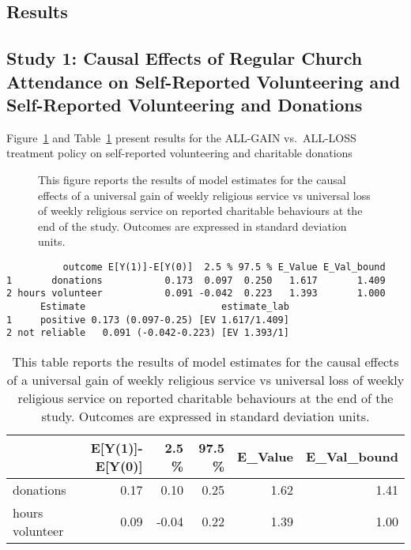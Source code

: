 \documentclass[
  single column]{article}
\begin{document}
\newpage{}

\subsection{Results}\label{results}

\subsection{Study 1: Causal Effects of Regular Church Attendance on
Self-Reported Volunteering and Self-Reported Volunteering and
Donations}\label{study-1-causal-effects-of-regular-church-attendance-on-self-reported-volunteering-and-self-reported-volunteering-and-donations}

Figure~\ref{fig-1_1} and Table~\ref{tbl-1_1} present results for the
ALL-GAIN vs.~ALL-LOSS treatment policy on self-reported volunteering and
charitable donations

\begin{figure}


\caption{\label{fig-1_1}This figure reports the results of model
estimates for the causal effects of a universal gain of weekly religious
service vs universal loss of weekly religious service on reported
charitable behaviours at the end of the study. Outcomes are expressed in
standard deviation units.}

\end{figure}%

\begin{verbatim}
          outcome E[Y(1)]-E[Y(0)]  2.5 % 97.5 % E_Value E_Val_bound
1       donations           0.173  0.097  0.250   1.617       1.409
2 hours volunteer           0.091 -0.042  0.223   1.393       1.000
      Estimate                        estimate_lab
1     positive 0.173 (0.097-0.25) [EV 1.617/1.409]
2 not reliable   0.091 (-0.042-0.223) [EV 1.393/1]
\end{verbatim}

\begin{longtable}[]{@{}lrrrrr@{}}

\caption{\label{tbl-1_1}This table reports the results of model
estimates for the causal effects of a universal gain of weekly religious
service vs universal loss of weekly religious service on reported
charitable behaviours at the end of the study. Outcomes are expressed in
standard deviation units.}

\tabularnewline

\toprule\noalign{}
& E{[}Y(1){]}-E{[}Y(0){]} & 2.5 \% & 97.5 \% & E\_Value &
E\_Val\_bound \\
\midrule\noalign{}
\endhead
\bottomrule\noalign{}
\endlastfoot
donations & 0.17 & 0.10 & 0.25 & 1.62 & 1.41 \\
hours volunteer & 0.09 & -0.04 & 0.22 & 1.39 & 1.00 \\

\end{longtable}
\end{document}
